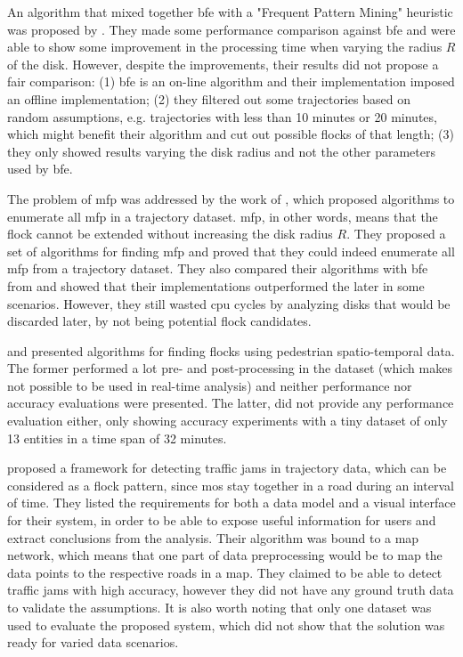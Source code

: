 An algorithm that mixed together \ac{bfe} \cite{vieira} with a "Frequent Pattern Mining" heuristic was proposed by
. They made some performance comparison against \ac{bfe} and were able to show some improvement in
the processing time when varying the radius $R$ of the disk. However, despite the improvements, their results did not
propose a fair comparison: (1) \ac{bfe} is an on-line algorithm and their implementation imposed an offline
implementation; (2) they filtered out some trajectories based on random assumptions, e.g. trajectories with less than 10
minutes or 20 minutes, which might benefit their algorithm and cut out possible flocks of that length; (3) they only
showed results varying the disk radius and not the other parameters used by \ac{bfe}.

The problem of \ac{mfp} was addressed by the work of , which proposed algorithms to enumerate
all \ac{mfp} in a trajectory dataset. \ac{mfp}, in other words, means that the flock cannot be extended without
increasing the disk radius $R$. They proposed a set of algorithms for finding \ac{mfp} and proved that they could indeed
enumerate all \ac{mfp} from a trajectory dataset. They also compared their algorithms with \ac{bfe} from
 and showed that their implementations outperformed the later in some scenarios. However, they still
wasted \ac{cpu} cycles by analyzing disks that would be discarded later, by not being potential flock candidates.

 and  presented algorithms for finding flocks using pedestrian
spatio-temporal data. The former performed a lot pre- and post-processing in the dataset (which makes not possible to be
used in real-time analysis) and neither performance nor accuracy evaluations were presented. The latter, did not
provide any performance evaluation either, only showing accuracy experiments with a tiny dataset of only 13 entities in
a time span of 32 minutes.

 proposed a framework for detecting traffic jams in trajectory data, which can be
considered as a flock pattern, since \acp{mo} stay together in a road during an interval of time. They listed the
requirements for both a data model and a visual interface for their system, in order to be able to expose useful
information for users and extract conclusions from the analysis. Their algorithm was bound to a map network, which means
that one part of data preprocessing would be to map the data points to the respective roads in a map. They claimed to be
able to detect traffic jams with high accuracy, however they did not have any ground truth data to validate the
assumptions. It is also worth noting that only one dataset was used to evaluate the proposed system, which did not show
that the solution was ready for varied data scenarios.

